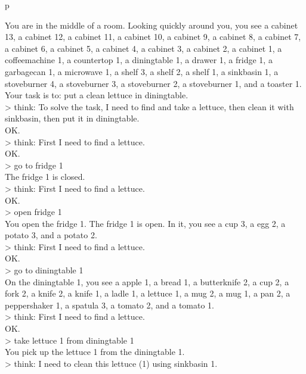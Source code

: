 \begin{table}[H]
\scriptsize
\begin{minipage}{0.9\linewidth}

\caption{An \modelim{} prompt on the ALFWorld clean task.}
\label{prompt:alfworld_react}
\centering
\ttfamily
\begin{tabular}{p\linewidth}
\midrule

You are in the middle of a room. Looking quickly around you, you see a cabinet 13, a cabinet 12, a cabinet 11, a cabinet 10, a cabinet 9, a cabinet 8, a cabinet 7, a cabinet 6, a cabinet 5, a cabinet 4, a cabinet 3, a cabinet 2, a cabinet 1, a coffeemachine 1, a countertop 1, a diningtable 1, a drawer 1, a fridge 1, a garbagecan 1, a microwave 1, a shelf 3, a shelf 2, a shelf 1, a sinkbasin 1, a stoveburner 4, a stoveburner 3, a stoveburner 2, a stoveburner 1, and a toaster 1.
Your task is to: put a clean lettuce in diningtable.\\
> think: To solve the task, I need to find and take a lettuce, then clean it with sinkbasin, then put it in diningtable.\\
OK.\\
> think: First I need to find a lettuce.\\
OK.\\
> go to fridge 1\\
The fridge 1 is closed.\\
> think: First I need to find a lettuce.\\
OK.\\
> open fridge 1\\
You open the fridge 1. The fridge 1 is open. In it, you see a cup 3, a egg 2, a potato 3, and a potato 2.\\
> think: First I need to find a lettuce.\\
OK.\\
> go to diningtable 1\\
On the diningtable 1, you see a apple 1, a bread 1, a butterknife 2, a cup 2, a fork 2, a knife 2, a knife 1, a ladle 1, a lettuce 1, a mug 2, a mug 1, a pan 2, a peppershaker 1, a spatula 3, a tomato 2, and a tomato 1.\\
> think: First I need to find a lettuce.\\
OK.\\
> take lettuce 1 from diningtable 1\\
You pick up the lettuce 1 from the diningtable 1.\\
> think: I need to clean this lettuce (1) using sinkbasin 1.\\

\end{tabular}
\end{minipage}
\end{table}
